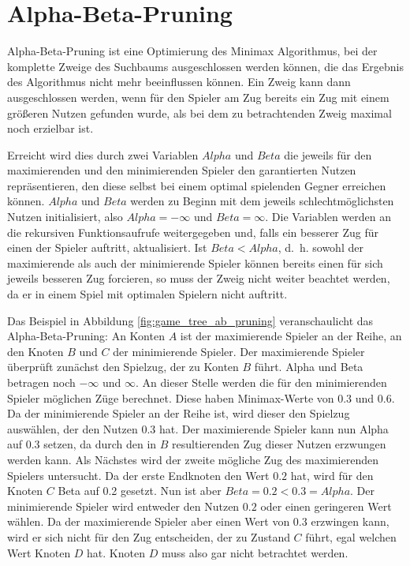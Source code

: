 \section{Alpha-Beta-Pruning}
\label{sec:alphabeta}

Alpha-Beta-Pruning ist eine Optimierung des Minimax Algorithmus, bei der komplette Zweige des Suchbaums ausgeschlossen
werden können, die das Ergebnis des Algorithmus nicht mehr beeinflussen können. Ein Zweig kann dann ausgeschlossen
werden, wenn für den Spieler am Zug bereits ein Zug mit einem größeren Nutzen gefunden wurde, als bei dem zu
betrachtenden Zweig maximal noch erzielbar ist.

Erreicht wird dies durch zwei Variablen $Alpha$ und $Beta$ die jeweils für den maximierenden und den minimierenden
Spieler den garantierten Nutzen repräsentieren, den diese selbst bei einem optimal spielenden Gegner erreichen können.
$Alpha$ und $Beta$ werden zu Beginn mit dem jeweils schlechtmöglichsten Nutzen initialisiert, also $Alpha = -\infty$ und
$Beta = \infty$. Die Variablen werden an die rekursiven Funktionsaufrufe weitergegeben und, falls ein besserer Zug für
einen der Spieler auftritt, aktualisiert. Ist $Beta < Alpha$, d. h. sowohl der maximierende als auch der minimierende
Spieler können bereits einen für sich jeweils besseren Zug forcieren, so muss der Zweig nicht weiter beachtet werden, da
er in einem Spiel mit optimalen Spielern nicht auftritt.

Das Beispiel in Abbildung \ref{fig:game_tree_ab_pruning} veranschaulicht das Alpha-Beta-Pruning: An Konten $A$ ist der
maximierende Spieler an der Reihe, an den Knoten $B$ und $C$ der minimierende Spieler. Der maximierende Spieler
überprüft zunächst den Spielzug, der zu Konten $B$ führt. Alpha und Beta betragen noch $-\infty$ und $\infty$. An dieser
Stelle werden die für den minimierenden Spieler möglichen Züge berechnet. Diese haben Minimax-Werte von $0.3$ und $0.6$.
Da der minimierende Spieler an der Reihe ist, wird dieser den Spielzug auswählen, der den Nutzen $0.3$ hat. Der
maximierende Spieler kann nun Alpha auf 0.3 setzen, da durch den in $B$ resultierenden Zug dieser Nutzen erzwungen
werden kann. Als Nächstes wird der zweite mögliche Zug des maximierenden Spielers untersucht. Da der erste Endknoten den
Wert $0.2$ hat, wird für den Knoten $C$ Beta auf 0.2 gesetzt. Nun ist aber $Beta=0.2<0.3=Alpha$. Der minimierende
Spieler wird entweder den Nutzen $0.2$ oder einen geringeren Wert wählen. Da der maximierende Spieler aber einen Wert
von $0.3$ erzwingen kann, wird er sich nicht für den Zug entscheiden, der zu Zustand $C$ führt, egal welchen Wert Knoten
$D$ hat. Knoten $D$ muss also gar nicht betrachtet werden.

